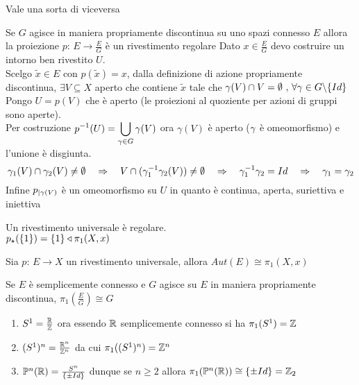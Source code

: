 Vale una sorta di viceversa
\begin{prop}Se $G$ agisce in maniera propriamente discontinua su uno spazi connesso $E$ allora la proiezione $p:\, E \to \frac{E}{G}$ \`e un rivestimento regolare
\proof Dato $x\in \frac{E}{G}$ devo costruire un intorno ben rivestito $U$.\\
Scelgo $\tilde{x}\in E$ con $p(\tilde{x})=x$, dalla definizione di azione propriamente discontinua, $\exists V \subseteq X$ aperto che contiene $\tilde{x}$ tale che $\gamma(V) \cap V=\emptyset \ , \, \forall \gamma \in G\backslash \{ Id\}$\\
Pongo $U=p(V)$ che \`e aperto (le proiezioni al quoziente per azioni di gruppi sono aperte).\\
Per costruzione $\displaystyle p^{-1}  (U) =\bigcup_{\gamma\in G} \gamma(V)$ ora $\gamma(V)$ \`e aperto ($\gamma$ \`e omeomorfismo)  e l'unione \`e disgiunta.\\
$$\gamma_1(V) \cap \gamma_2(V)\neq \emptyset \quad \Rightarrow\quad V \cap (\gamma_1^{-1} \gamma_2(V)) \neq \emptyset \quad \Rightarrow \quad \gamma_1^{-1}\gamma_2=Id\quad \Rightarrow \quad \gamma_1=\gamma_2$$
Infine $p_{\vert \gamma(V)}$ \`e un omeomorfismo su $U$ in quanto \`e continua, aperta, suriettiva e iniettiva
\end{prop}
\spazio
\begin{oss} Un rivestimento universale \`e regolare.\\
$p_\star(\{1\})=\{ 1 \}\triangleleft \pi_1(X,x)$
\end{oss}

\begin{cor}Sia $p:\, E \to X$ un rivestimento universale, allora $Aut(E) \cong \pi_1(X,x)$
\end{cor}
\begin{cor} Se $E$ \`e semplicemente connesso e $G$ agisce su $E$ in maniera propriamente discontinua, $\pi_1\left(\frac{E}{G}\right) \cong G$
\end{cor}
\begin{ese}\bbianco
\begin{enumerate}
\item $S^1=\frac{\mathbb{R}}{\mathbb{Z}}$ ora essendo $\mathbb{R}$ semplicemente connesso si ha $\pi_1(S^1)=\mathbb{Z}$
\item $(S^1)^n=\frac{\mathbb{R}^n}{\mathbb{Z}^n}$ da cui $\pi_1((S^1)^n)=\mathbb{Z}^n$
\item $\mathbb{P}^n (\mathbb{R})= \frac{S^n}{\{ \pm Id\}}$ dunque se $n\geq 2 $ allora $\pi_1(\mathbb{P}^n (\mathbb{R})) \cong \{ \pm Id \} = \mathbb{Z}_2$
\end{enumerate}
\end{ese}

